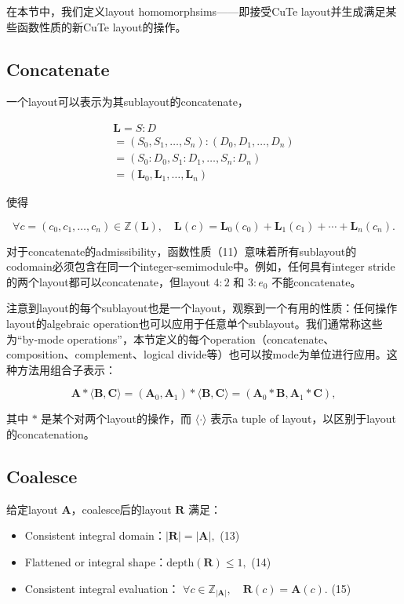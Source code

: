 \documentclass{article}
\begin{document}
在本节中，我们定义layout homomorphsims——即接受CuTe layout并生成满足某些函数性质的新CuTe layout的操作。
\subsection{Concatenate}
一个layout可以表示为其sublayout的concatenate，

\[
\begin{aligned}
    \mathbf{L} = S : D \\
= (S_0, S_1, \ldots, S_n) : (D_0, D_1, \ldots, D_n) \\
= (S_0 : D_0, S_1 : D_1, \ldots, S_n : D_n) \\
= (\mathbf{L}_0, \mathbf{L}_1, \ldots, \mathbf{L}_n)
\end{aligned}
\]

使得

\[
\forall c = (c_0, c_1, \ldots, c_n) \in \mathbb{Z}(\mathbf{L}), \quad \mathbf{L}(c) = \mathbf{L}_0(c_0) + \mathbf{L}_1(c_1) + \cdots + \mathbf{L}_n(c_n).  \tag{11}
\]

对于concatenate的admissibility，函数性质（11）意味着所有sublayout的codomain必须包含在同一个integer-semimodule中。例如，任何具有integer stride的两个layout都可以concatenate，但layout \( 4 : 2 \) 和 \( 3 : e_0 \) 不能concatenate。

注意到layout的每个sublayout也是一个layout，观察到一个有用的性质：任何操作layout的algebraic operation也可以应用于任意单个sublayout。我们通常称这些为“by-mode operations”，本节定义的每个operation（concatenate、composition、complement、logical divide等）也可以按mode为单位进行应用。这种方法用组合子表示：

\[
\mathbf{A} * \langle \mathbf{B}, \mathbf{C} \rangle = (\mathbf{A}_0, \mathbf{A}_1) * \langle \mathbf{B}, \mathbf{C} \rangle = (\mathbf{A}_0 * \mathbf{B}, \mathbf{A}_1 * \mathbf{C}), \tag{12}
\]

其中 \( * \) 是某个对两个layout的操作，而 \( \langle \cdot \rangle \) 表示a tuple of layout，以区别于layout的concatenation。

\subsection{Coalesce}
给定layout \( \mathbf{A} \)，coalesce后的layout \( \mathbf{R} \) 满足：

\begin{itemize}
\item Consistent integral domain：\( |\mathbf{R}| = |\mathbf{A}|, \)  \hfill (13)
\item Flattened or integral shape：\( \text{depth}(\mathbf{R}) \leq 1, \)  \hfill (14)
\item Consistent integral evaluation： \( \forall c \in \mathbb{Z}_{|\mathbf{A}|}, \quad \mathbf{R}(c) = \mathbf{A}(c).\)  \hfill (15)
\end{itemize}
\end{document}

